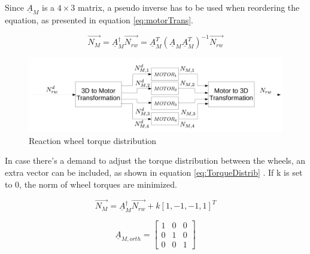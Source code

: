 Since $\underline{A}_{M} $ is a $ 4 \times 3 $ matrix, a pseudo inverse has to be used when reordering the equation, as presented in equation \ref{eq:motorTrans}. 

\begin{equation}
\label{eq:motorTrans}
\vec{N_{M}} =  \underline{A}_{M} ^\dagger \vec{N_{rw}}   =  \underline{A}_{M}^T  (\underline{A}_{M} \underline{A}_{M} ^T)^{-1} \vec{N_{rw}}
\end{equation}

\begin{figure}[H]
	\centering 
	\includegraphics[width=170mm]{figures/distribution}	
	\caption{Reaction wheel torque distribution}
	\label{fig:torqueDistribution}
\end{figure}



In case there's a demand to adjust the torque distribution between the wheels, an extra vector can be included, as shown in equation \ref{eq:TorqueDistrib}
\cite[equation 18.41-42]{SADC}. If k is set to 0, the norm of wheel torques are minimized.

\begin{equation}
\label{eq:TorqueDistrib}
 \vec{N_{M}} = \underline{A}^\dagger_{M} \vec{N_{rw}}  + k\left[1,-1,-1,1\right]^T
\end{equation}


\begin{equation}
\underline{A}_{M,orth}  = 
\begin{bmatrix}
1       & 0  &  0 \\
0       & 1  &  0  \\
0       & 0   & 1
\end{bmatrix} 
\label{eq:orthoMatrix}
\end{equation}
